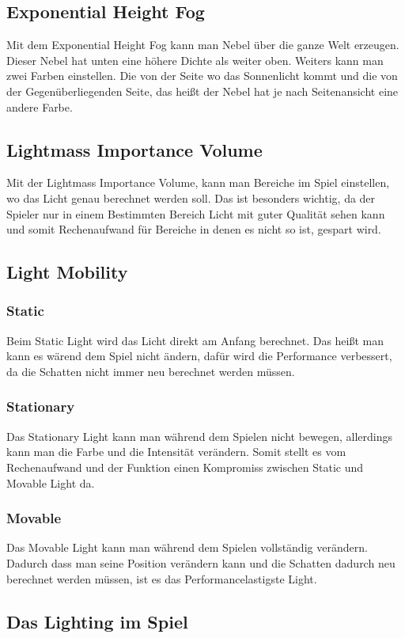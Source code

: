 \subsection{Exponential Height Fog}
Mit dem Exponential Height Fog kann man Nebel über die ganze Welt erzeugen. Dieser Nebel hat unten eine höhere Dichte als weiter oben. Weiters kann man zwei Farben einstellen.
Die von der Seite wo das Sonnenlicht kommt und die von der Gegenüberliegenden Seite, das heißt der Nebel hat je nach Seitenansicht eine andere Farbe. \citep{unreal:exponentialHeightFog}

\subsection{Lightmass Importance Volume}
Mit der Lightmass Importance Volume, kann man Bereiche im Spiel einstellen, wo das Licht genau berechnet werden soll. Das ist besonders wichtig, da der Spieler nur in einem
Bestimmten Bereich Licht mit guter Qualität sehen kann und somit Rechenaufwand für Bereiche in denen es nicht so ist, gespart wird. \citep{unreal:lightmassImportanceVolume}

\subsection{Light Mobility}
\subsubsection{Static}
Beim Static Light wird das Licht direkt am Anfang berechnet. Das heißt man kann es wärend dem Spiel nicht ändern, dafür wird die Performance verbessert, da
die Schatten nicht immer neu berechnet werden müssen. \citep{unreal:types_of_light}

\subsubsection{Stationary}
Das Stationary Light kann man während dem Spielen nicht bewegen, allerdings kann man die Farbe und die Intensität verändern. Somit stellt es vom Rechenaufwand und
der Funktion einen Kompromiss zwischen Static und Movable Light da. \citep{unreal:types_of_light}

\subsubsection{Movable}
Das Movable Light kann man während dem Spielen vollständig verändern. Dadurch dass man seine Position verändern kann und die Schatten dadurch neu berechnet werden müssen,
ist es das Performancelastigste Light.

\subsection{Das Lighting im Spiel}
